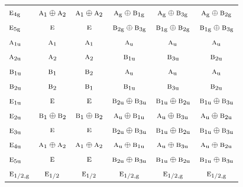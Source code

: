 \documentclass[10pt,a4paper]{article}
\numberwithin{equation}{section}
\newcommand{\irr}[1]{\text{\normalfont\scshape #1}}
\newcommand{\ptag}[1]{\mathrm{#1}}
\begin{document}
{\begin{longtable}{@{}lccccc@{}}
$\irr{e}_{4\ptag{g}}$ & $\irr{a}_{1}\oplus \irr{a}_{2}$ & $\irr{a}_{1}\oplus \irr{a}_{2}$ & $\irr{a}_{\ptag{g}}\oplus \irr{b}_{1\ptag{g}}$ & $\irr{a}_{\ptag{g}}\oplus \irr{b}_{3\ptag{g}}$ & $\irr{a}_{\ptag{g}}\oplus \irr{b}_{2\ptag{g}}$\\
$\irr{e}_{5\ptag{g}}$ & $\irr{e}$ & $\irr{e}$ & $\irr{b}_{2\ptag{g}}\oplus \irr{b}_{3\ptag{g}}$ & $\irr{b}_{1\ptag{g}}\oplus \irr{b}_{2\ptag{g}}$ & $\irr{b}_{1\ptag{g}}\oplus \irr{b}_{3\ptag{g}}$\\
$\irr{a}_{1\ptag{u}}$ & $\irr{a}_{1}$ & $\irr{a}_{1}$ & $\irr{a}_{\ptag{u}}$ & $\irr{a}_{\ptag{u}}$ & $\irr{a}_{\ptag{u}}$\\
$\irr{a}_{2\ptag{u}}$ & $\irr{a}_{2}$ & $\irr{a}_{2}$ & $\irr{b}_{1\ptag{u}}$ & $\irr{b}_{3\ptag{u}}$ & $\irr{b}_{2\ptag{u}}$\\
$\irr{b}_{1\ptag{u}}$ & $\irr{b}_{1}$ & $\irr{b}_{2}$ & $\irr{a}_{\ptag{u}}$ & $\irr{a}_{\ptag{u}}$ & $\irr{a}_{\ptag{u}}$\\
$\irr{b}_{2\ptag{u}}$ & $\irr{b}_{2}$ & $\irr{b}_{1}$ & $\irr{b}_{1\ptag{u}}$ & $\irr{b}_{3\ptag{u}}$ & $\irr{b}_{2\ptag{u}}$\\
$\irr{e}_{1\ptag{u}}$ & $\irr{e}$ & $\irr{e}$ & $\irr{b}_{2\ptag{u}}\oplus \irr{b}_{3\ptag{u}}$ & $\irr{b}_{1\ptag{u}}\oplus \irr{b}_{2\ptag{u}}$ & $\irr{b}_{1\ptag{u}}\oplus \irr{b}_{3\ptag{u}}$\\
$\irr{e}_{2\ptag{u}}$ & $\irr{b}_{1}\oplus \irr{b}_{2}$ & $\irr{b}_{1}\oplus \irr{b}_{2}$ & $\irr{a}_{\ptag{u}}\oplus \irr{b}_{1\ptag{u}}$ & $\irr{a}_{\ptag{u}}\oplus \irr{b}_{3\ptag{u}}$ & $\irr{a}_{\ptag{u}}\oplus \irr{b}_{2\ptag{u}}$\\
$\irr{e}_{3\ptag{u}}$ & $\irr{e}$ & $\irr{e}$ & $\irr{b}_{2\ptag{u}}\oplus \irr{b}_{3\ptag{u}}$ & $\irr{b}_{1\ptag{u}}\oplus \irr{b}_{2\ptag{u}}$ & $\irr{b}_{1\ptag{u}}\oplus \irr{b}_{3\ptag{u}}$\\
$\irr{e}_{4\ptag{u}}$ & $\irr{a}_{1}\oplus \irr{a}_{2}$ & $\irr{a}_{1}\oplus \irr{a}_{2}$ & $\irr{a}_{\ptag{u}}\oplus \irr{b}_{1\ptag{u}}$ & $\irr{a}_{\ptag{u}}\oplus \irr{b}_{3\ptag{u}}$ & $\irr{a}_{\ptag{u}}\oplus \irr{b}_{2\ptag{u}}$\\
$\irr{e}_{5\ptag{u}}$ & $\irr{e}$ & $\irr{e}$ & $\irr{b}_{2\ptag{u}}\oplus \irr{b}_{3\ptag{u}}$ & $\irr{b}_{1\ptag{u}}\oplus \irr{b}_{2\ptag{u}}$ & $\irr{b}_{1\ptag{u}}\oplus \irr{b}_{3\ptag{u}}$\\
$\irr{e}_{1/2,\ptag{g}}$ & $\irr{e}_{1/2}$ & $\irr{e}_{1/2}$ & $\irr{e}_{1/2,\ptag{g}}$ & $\irr{e}_{1/2,\ptag{g}}$ & $\irr{e}_{1/2,\ptag{g}}$\\

\end{longtable}}
\end{document}
